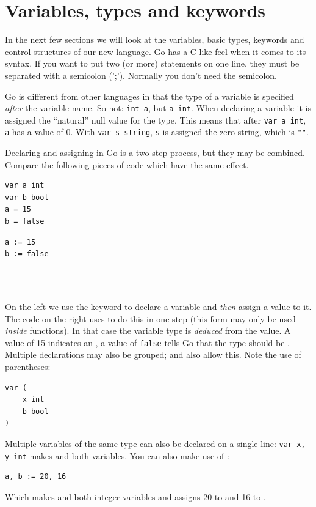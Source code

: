 \section{Variables, types and keywords}
\label{sec:vars}
In the next few sections we will look at the variables, basic types,
keywords and control structures of our new language. 
Go has a C-like feel when it comes to its syntax. 
If you want to put two (or more) statements on one line, they must be
separated with a semicolon (';'). Normally you don't need the semicolon.

Go is different from other languages in that the type of a variable
is specified \emph{after} the variable name. So not: 
\lstinline{int a}, but \lstinline{a int}. When declaring a variable it
is assigned the ``natural'' null value for the type. This means that after
\lstinline{var a int}, \lstinline{a} has a value of 0. With
\lstinline{var s string}, \lstinline{s} is assigned the zero string,
which is \lstinline{""}. 

Declaring and assigning in Go is a two step process, but they may
be combined. Compare the following pieces of code which have
the same effect. 

\begin{minipage}{.5\textwidth}
\begin{lstlisting}[linewidth=.5\textwidth,caption={Declaration with =}]
var a int
var b bool
a = 15
b = false
\end{lstlisting}
\hfill
\end{minipage}
\begin{minipage}{.5\textwidth}
\begin{lstlisting}[linewidth=.5\textwidth,caption={Declaration with :=}]
a := 15
b := false
\end{lstlisting}
\ \\
\ \\
\hfill
\end{minipage}

On the left we use the
 keyword to declare a variable and \emph{then} assign a value to
it. The code on the right uses \mbox{\key{:=}{ }} to do this in one
step (this form may only be used \emph{inside} functions).
In that case the variable
type is \emph{deduced} from the value. A value of 15 indicates an ,
a value of \texttt{false} tells Go that the type should be . 
Multiple  declarations may also be grouped; 
and  also allow this. Note the use of parentheses:
\begin{lstlisting}
var (
    x int
    b bool
)
\end{lstlisting}
Multiple variables of the same type can also be declared on a
single line: \lstinline{var x, y int} makes  and  both
 variables. You can also make use of :
\begin{lstlisting}
a, b := 20, 16
\end{lstlisting}
Which makes  and  both integer variables and assigns
20 to  and 16 to .

